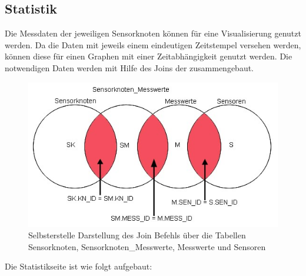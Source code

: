
\newpage
\subsection{Statistik}\label{Statistik}
	Die Messdaten der jeweiligen Sensorknoten können für eine Visualisierung genutzt werden. Da die Daten mit jeweils einem eindeutigen Zeitstempel versehen werden, können diese für einen Graphen mit einer Zeitabhängigkeit genutzt werden. Die notwendigen Daten werden mit Hilfe des Joins der  zusammengebaut.
	\begin{figure}[htp]
		\includegraphics[width=\textwidth]{Bilder/Kapitel4/uebersichtjoin.jpg}
		\caption[Mengendarstellung der Übersichtsseite]{Selbsterstelle Darstellung des Join Befehls über die Tabellen Sensorknoten, Sensorknoten\_Messwerte, Messwerte und Sensoren}
		\label{fig:Kapitel4/uebersichtjoin.jpg1}
	\end{figure}
	Die Statistikseite ist wie folgt aufgebaut:
